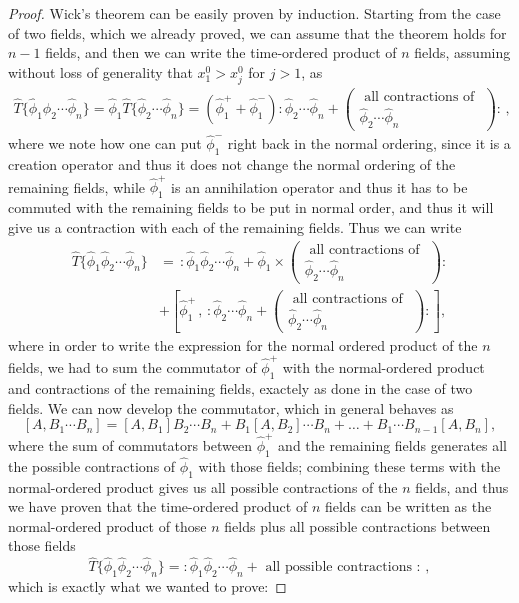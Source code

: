 \begin{proof}
    Wick's theorem can be easily proven by induction. Starting from the case of two fields, which we already proved, we can assume that the theorem holds for \(n-1\) fields, and then we can write the time-ordered product of \(n\) fields, assuming without loss of generality that \(x_1^0 > x_j^0\) for \(j>1\), as
    \[
        \begin{aligned}
            \hat{T} \{ \hat{\phi}_1 \hat{\phi}_2 \cdots \hat{\phi}_n \} = \hat{\phi}_1 \hat{T} \{ \hat{\phi}_2 \cdots \hat{\phi}_n \} = (\hat{\phi}^+_1 + \hat{\phi}^-_1) : \hat{\phi}_2 \cdots \hat{\phi}_n + (\substack{\text{ all contractions of } \\ \hat{\phi}_2 \cdots \hat{\phi}_n}) :\, ,
        \end{aligned}
    \]
    where we note how one can put \(\hat{\phi}_1^-\) right back in the normal ordering, since it is a creation operator and thus it does not change the normal ordering of the remaining fields, while \(\hat{\phi}_1^+\) is an annihilation operator and thus it has to be commuted with the remaining fields to be put in normal order, and thus it will give us a contraction with each of the remaining fields. Thus we can write
    \[
        \begin{aligned}
            \hat{T} \{ \hat{\phi}_1 \hat{\phi}_2 \cdots \hat{\phi}_n \} & = \, : \hat{\phi}_1 \hat{\phi}_2 \cdots \hat{\phi}_n + \hat{\phi}_1 \times (\substack{\text{ all contractions of } \\ \hat{\phi}_2 \cdots \hat{\phi}_n}) : \\
                                                                        & + \left[ \hat{\phi}_1^+ \, , \, : \hat{\phi}_2 \cdots \hat{\phi}_n + (\substack{\text{ all contractions of }       \\ \hat{\phi}_2 \cdots \hat{\phi}_n}) : \right],
        \end{aligned}
    \]
    where in order to write the expression for the normal ordered product of the \(n\) fields, we had to sum the commutator of \(\hat{\phi}_1^+\) with the normal-ordered product and contractions of the remaining fields, exactely as done in the case of two fields. We can now develop the commutator, which in general behaves as
    \[
        [A , B_1 \cdots B_n] = [A,B_1] B_2 \cdots B_n + B_1 [A,B_2] \cdots B_n + \ldots + B_1 \cdots B_{n-1} [A,B_n],
    \]
    where the sum of commutators between \(\hat{\phi}_1^+\) and the remaining fields generates all the possible contractions of \(\hat{\phi}_1\) with those fields; combining these terms with the normal-ordered product gives us all possible contractions of the \(n\) fields, and thus we have proven that the time-ordered product of \(n\) fields can be written as the normal-ordered product of those \(n\) fields plus all possible contractions between those fields
    \[
        \hat{T} \{ \hat{\phi}_1 \hat{\phi}_2 \cdots \hat{\phi}_n \} = : \hat{\phi}_1 \hat{\phi}_2 \cdots \hat{\phi}_n + \text{ all possible contractions } :\, ,
    \]
    which is exactly what we wanted to prove:
\end{proof}

